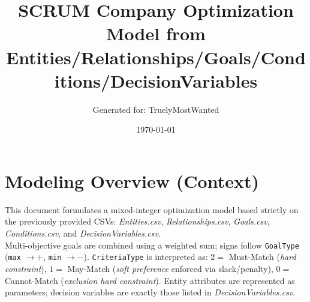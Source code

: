 \documentclass[11pt,a4paper]{article}
\title{SCRUM Company Optimization Model from Entities/Relationships/Goals/Conditions/DecisionVariables}
\author{Generated for: TruelyMostWanted}
\date{\today}
\begin{document}
\maketitle
\tableofcontents
\newpage

\section*{Modeling Overview (Context)}
This document formulates a mixed-integer optimization model based strictly on the previously provided CSVs:
\emph{Entities.csv}, \emph{Relationships.csv}, \emph{Goals.csv}, \emph{Conditions.csv}, and \emph{DecisionVariables.csv}. \\
Multi-objective goals are combined using a weighted sum; signs follow \texttt{GoalType} (\texttt{max} $\to +$, \texttt{min} $\to -$). 
\texttt{CriteriaType} is interpreted as: $2=$ Must-Match (\emph{hard constraint}), $1=$ May-Match (\emph{soft preference} enforced via slack/penalty), $0=$ Cannot-Match (\emph{exclusion hard constraint}). 
Entity attributes are represented as parameters; decision variables are exactly those listed in \emph{DecisionVariables.csv}.
\end{document}
